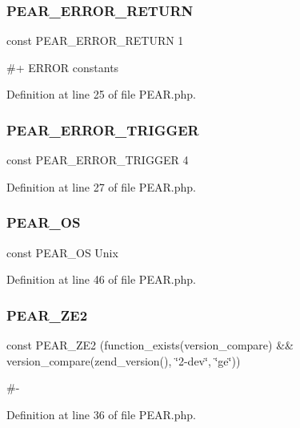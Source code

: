 \subsubsection{\texorpdfstring{P\+E\+A\+R\+\_\+\+E\+R\+R\+O\+R\+\_\+\+R\+E\+T\+U\+RN}{PEAR\_ERROR\_RETURN}}
{\footnotesize\ttfamily const P\+E\+A\+R\+\_\+\+E\+R\+R\+O\+R\+\_\+\+R\+E\+T\+U\+RN 1}

\#+ E\+R\+R\+OR constants 

Definition at line 25 of file P\+E\+A\+R.\+php.

\hypertarget{PEAR_8php_a23a071419e1d6bbb554976e21d978d56}{}\label{PEAR_8php_a23a071419e1d6bbb554976e21d978d56} 
\subsubsection{\texorpdfstring{P\+E\+A\+R\+\_\+\+E\+R\+R\+O\+R\+\_\+\+T\+R\+I\+G\+G\+ER}{PEAR\_ERROR\_TRIGGER}}
{\footnotesize\ttfamily const P\+E\+A\+R\+\_\+\+E\+R\+R\+O\+R\+\_\+\+T\+R\+I\+G\+G\+ER 4}



Definition at line 27 of file P\+E\+A\+R.\+php.

\hypertarget{PEAR_8php_a5fd2c8f5bc659f777ab39b8bfd745c4c}{}\label{PEAR_8php_a5fd2c8f5bc659f777ab39b8bfd745c4c} 
\subsubsection{\texorpdfstring{P\+E\+A\+R\+\_\+\+OS}{PEAR\_OS}}
{\footnotesize\ttfamily const P\+E\+A\+R\+\_\+\+OS \textquotesingle{}Unix\textquotesingle{}}



Definition at line 46 of file P\+E\+A\+R.\+php.

\hypertarget{PEAR_8php_a16b6fef5a6547779f3d9d6e1b7c5c2b5}{}\label{PEAR_8php_a16b6fef5a6547779f3d9d6e1b7c5c2b5} 
\subsubsection{\texorpdfstring{P\+E\+A\+R\+\_\+\+Z\+E2}{PEAR\_ZE2}}
{\footnotesize\ttfamily const P\+E\+A\+R\+\_\+\+Z\+E2 (function\+\_\+exists(\textquotesingle{}version\+\_\+compare\textquotesingle{}) \&\& version\+\_\+compare(zend\+\_\+version(), \char`\"{}2-\/dev\char`\"{}, \char`\"{}ge\char`\"{}))}

\#-\/ 

Definition at line 36 of file P\+E\+A\+R.\+php.

